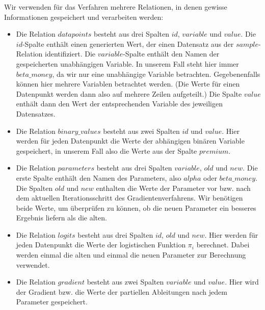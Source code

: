 Wir verwenden für das Verfahren mehrere Relationen, in denen gewisse Informationen gespeichert und verarbeiten werden:
\begin{itemize}
  \item Die Relation $datapoints$ besteht aus drei Spalten $id$, $variable$ und $value$. Die $id$-Spalte enthält einen generierten Wert, der einen Datensatz aus der $sample$-Relation identifiziert. Die $variable$-Spalte enthält den Namen der gespeicherten unabhängigen Variable. In unserem Fall steht hier immer $beta\_money$, da wir nur eine unabhängige Variable betrachten. Gegebenenfalls können hier mehrere Variablen betrachtet werden. (Die Werte für einen Datenpunkt werden dann also auf mehrere Zeilen aufgeteilt.) Die Spalte $value$ enthält dann den Wert der entsprechenden Variable des jeweiligen Datensatzes.
  \item Die Relation $binary\_values$ besteht aus zwei Spalten $id$ und $value$. Hier werden für jeden Datenpunkt die Werte der abhängigen binären Variable gespeichert, in unserem Fall also die Werte aus der Spalte $premium$.
  \item Die Relation $parameters$ besteht aus drei Spalten $variable$, $old$ und $new$. Die erste Spalte enthält den Namen des Parameters, also $alpha$ oder $beta\_money$. Die Spalten $old$ und $new$ enthalten die Werte der Parameter vor bzw. nach dem aktuellen Iterationsschritt des Gradientenverfahrens. Wir benötigen beide Werte, um überprüfen zu können, ob die neuen Parameter ein besseres Ergebnis liefern als die alten.
  \item Die Relation $logits$ besteht aus drei Spalten $id$, $old$ und $new$. Hier werden für jeden Datenpunkt die Werte der logistischen Funktion $\pi_i$ berechnet. Dabei werden einmal die alten und einmal die neuen Parameter zur Berechnung verwendet.
  \item Die Relation $gradient$ besteht aus zwei Spalten $variable$ und $value$. Hier wird der Gradient bzw. die Werte der partiellen Ableitungen nach jedem Parameter gespeichert.
\end{itemize}

